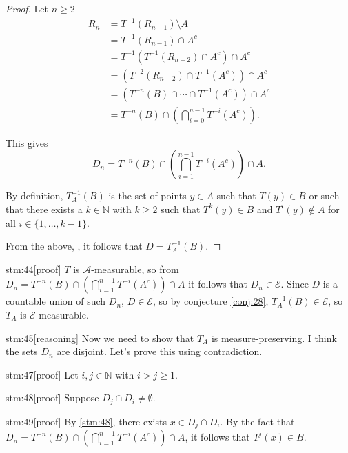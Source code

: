 \documentclass{article}
\begin{document}
\begin{proof}
Let $n \ge 2$
\begin{align*}
R_n &= T^{-1}(R_{n-1}) \setminus A \\
&= T^{-1}(R_{n-1}) \cap A^c \\
&= T^{-1}(T^{-1}(R_{n-2}) \cap A^c) \cap A^c \\
&= (T^{-2}(R_{n-2}) \cap T^{-1}(A^c)) \cap A^c \\
&= (T^{-n}(B) \cap \cdots \cap T^{-1}(A^c)) \cap A^c \\
&= T^{-n}(B) \cap \left( \bigcap_{i=0}^{n-1} T^{-i}(A^c) \right).
\end{align*}

This gives
\[
D_n = T^{-n}(B) \cap \left( \bigcap_{i=1}^{n-1} T^{-i}(A^c) \right) \cap A.
\]

By definition, $T_A^{-1}(B)$ is the set of points $y \in A$ such that $T(y) \in B$ or such that there exists a $k \in \mathbb{N}$ with $k \ge 2$ such that $T^k(y) \in B$ and $T^i(y) \notin A$ for all $i \in \{1, \ldots, k-1\}$.

From the above, , it follows that $D = T_A^{-1}(B)$.
\end{proof}

\begin{stm}{stm:44}[proof]
$T$ is $\mathcal{A}$-measurable, so from $D_n = T^{-n}(B) \cap \left( \bigcap_{i=1}^{n-1} T^{-i}(A^c) \right) \cap A$ it follows that $D_n \in \mathcal{E}$. Since $D$ is a countable union of such $D_n$, $D \in \mathcal{E}$, so by conjecture \ref{conj:28}, $T_A^{-1}(B) \in \mathcal{E}$, so $T_A$ is $\mathcal{E}$-measurable.
\end{stm}

\begin{stm}{stm:45}[reasoning]
Now we need to show that $T_A$ is measure-preserving. I think the sets $D_n$ are disjoint. Let's prove this using contradiction.
\end{stm}

\begin{stm}{stm:47}[proof]
Let $i, j \in \mathbb{N}$ with $i > j \ge 1$.
\end{stm}

\begin{stm}{stm:48}[proof]
Suppose $D_j \cap D_i \ne \emptyset$.
\end{stm}

\begin{stm}{stm:49}[proof]
By \ref{stm:48}, there exists $x \in D_j \cap D_i$. By the fact that $D_n = T^{-n}(B) \cap \left( \bigcap_{i=1}^{n-1} T^{-i}(A^c) \right) \cap A$, it follows that $T^j(x) \in B$.  
\end{stm}
\end{document}
